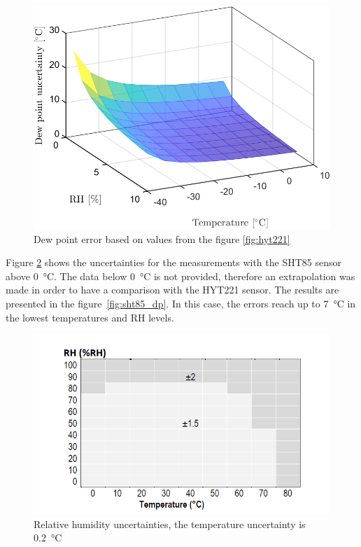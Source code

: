 \begin{figure}[!h]
\centering
\includegraphics[width=0.6\columnwidth]{Chapter5/images/HYT221RH7T15.png}
\caption{Dew point error based on values from the figure \ref{fig:hyt221}}
\label{fig:hyt221_dp}
\end{figure}
\newpage
Figure \ref{fig:sht85} shows the uncertainties for the measurements with the SHT85 sensor above \SI{0}{\celsius}. The data below \SI{0}{\celsius} is not provided, therefore an extrapolation was made in order to have a comparison with the HYT221 sensor. The results are presented in the figure~\ref{fig:sht85_dp}. In this case, the errors reach up to \SI{7}{\celsius} in the lowest temperatures and \gls{RH} levels.
\begin{figure}[!h]
\centering
\includegraphics[width=0.65\columnwidth]{Chapter5/images/sht85_rh.png}
\caption{Relative humidity uncertainties, the temperature uncertainty is \SI{0.2}{\celsius} \cite{SHT85}}
\label{fig:sht85}
\end{figure}


